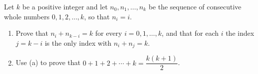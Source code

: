 Let $k$ be a positive integer and let $n_0,n_1,\dots,n_k$ be the sequence of consecutive whole numbers $0,1,2,\dots,k$, so that $n_i=i$.
\begin{enumerate}
\item[(a)] Prove that $n_i+n_{k-i}=k$ for every $i=0,1,\dots,k$, and that for each $i$ the index $j=k-i$ is the only index with $n_i+n_j=k$.
\item[(b)] Use (a) to prove that $0+1+2+\cdots+k=\dfrac{k(k+1)}{2}$.
\end{enumerate}
